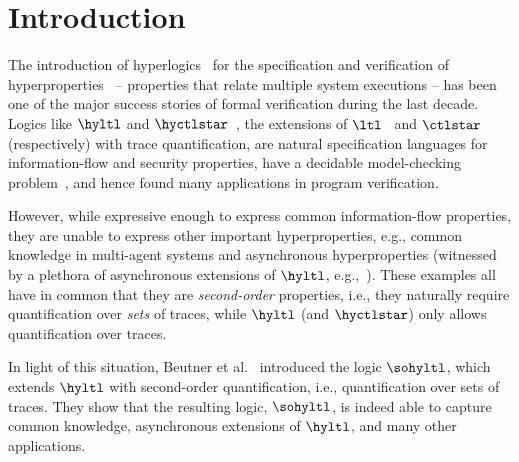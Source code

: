 
\section{Introduction}
\label{sec:intro}

The introduction of hyperlogics~\cite{ClarksonFKMRS14} for the specification and verification of hyperproperties~\cite{ClarksonS10} -- properties that relate multiple system executions -- has been one of the major success stories of formal verification during the last decade.
Logics like $\hyltl$ and $\hyctlstar$~\cite{ClarksonFKMRS14}, the extensions of $\ltl$~\cite{Pnueli77} 
and $\ctlstar$~\cite{EmersonH86} (respectively) with trace quantification, are natural specification languages for information-flow and security properties, have a decidable model-checking problem~\cite{FinkbeinerRS15}, and hence found many applications in program verification.

However, while expressive enough to express common information-flow properties, they are unable to express other important hyperproperties, e.g., common knowledge in multi-agent systems and asynchronous hyperproperties (witnessed by a plethora of asynchronous extensions of $\hyltl$, e.g.,~\cite{BartocciHNC23,DBLP:conf/cav/BaumeisterCBFS21,BeutnerF23,DBLP:journals/corr/abs-2404-16778,DBLP:conf/lics/BozzelliPS21,DBLP:conf/concur/BozzelliPS22,DBLP:journals/pacmpl/GutsfeldMO21,DBLP:conf/mfcs/KontinenSV23,KontinenSV24,DBLP:conf/mfcs/KrebsMV018}).
These examples all have in common that they are \emph{second-order} properties, i.e., they naturally require quantification over \emph{sets} of traces, while $\hyltl$ (and $\hyctlstar$) only allows quantification over traces.

In light of this situation, Beutner et al.~\cite{DBLP:conf/cav/BeutnerFFM23} introduced the logic $\sohyltl$, which extends $\hyltl$ with second-order quantification, i.e., quantification over sets of traces. 
They show that the resulting logic, $\sohyltl$, is indeed able to capture common knowledge, asynchronous extensions of $\hyltl$, and many other applications. 

